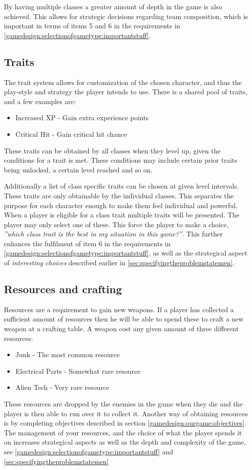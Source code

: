 By having multiple classes a greater amount of depth in the game is also achieved. This allows for strategic decisions regarding team composition, which is important in terms of items 5 and 6 in the requirements in \ref{gamedesign:selectionofgametype:importantstuff}.

\subsection*{Traits}\label{gamedesign:ourgame:traits}
The trait system allows for customization of the chosen character, and thus the play-style and strategy the player intends to use.
There is a shared pool of traits, and a few examples are:
\begin{itemize}
\item Increased XP - Gain extra experience points
\item Critical Hit  - Gain critical hit chance
\end{itemize} 
These traits can be obtained by all classes when they level up, given the conditions for a trait is met. These conditions may include certain prior traits being unlocked, a certain level reached and so on.

Additionally a list of class specific traits can be chosen at given level intervals. 
These traits are only obtainable by the individual classes. This separates the purpose for each character enough to make them feel individual and powerful. When a player is eligible for a class trait multiple traits will be presented. The player may only select one of these. This force the player to make a choice, \emph{''which class trait is the best in my situation in this game?''}. 
This further enhances the fulfilment of item 6 in the requirements in \ref{gamedesign:selectionofgametype:importantstuff}, as well as the strategical aspect of \emph{interesting choices} described earlier in \ref{sec:specifyingtheproblemstatemen}.

\subsection{Resources and crafting}\label{gamedesign:ourgame:crafting}
Resources are a requirement to gain new weapons.
If a player has collected a sufficient amount of resources then he will be able to spend these to craft a new weapon at a crafting table.
A weapon cost any given amount of three different resources:
\begin{itemize}
\item Junk - The most common resource
\item Electrical Parts - Somewhat rare resource
\item Alien Tech - Very rare resource
\end{itemize}
These resources are dropped by the enemies in the game when they die and the player is then able to run over it to collect it. Another way of obtaining resources is by completing objectives described in section \ref{gamedesign:ourgame:objectives}. 
The management of your resources, and the choice of what the player spends it on increases strategical aspects as well as the depth and complexity of the game, see \ref{gamedesign:selectionofgametype:importantstuff} and \ref{sec:specifyingtheproblemstatemen}

